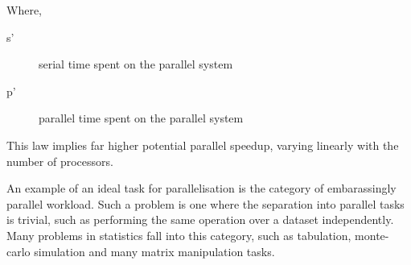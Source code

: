 
Where,

\begin{description}
	\item[s'] serial time spent on the parallel system
	\item[p'] parallel time spent on the parallel system
\end{description}

This law implies far higher potential parallel speedup, varying linearly
with the number of processors.

An example of an ideal task for parallelisation is the category of
embarassingly parallel workload. Such a problem is one where the
separation into parallel tasks is trivial, such as performing the same
operation over a dataset independently\cite{foster1995parallel}. Many
problems in statistics fall into this category, such as tabulation,
monte-carlo simulation and many matrix manipulation tasks.

